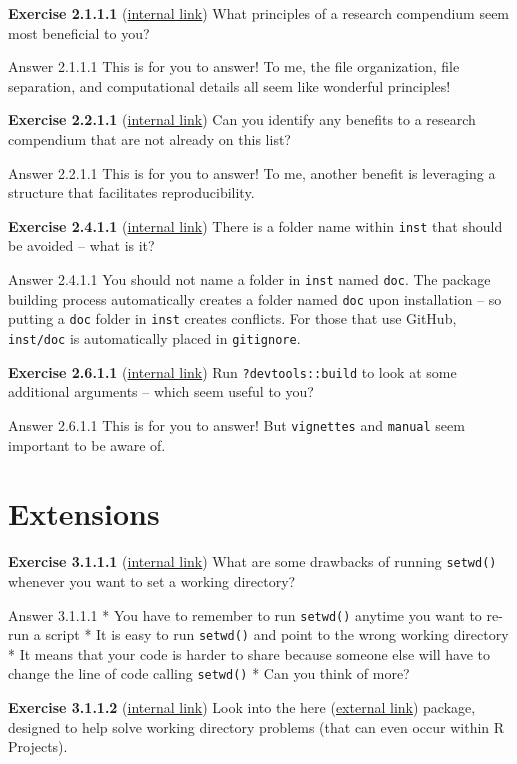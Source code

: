 \documentclass[
]{book}
\begin{document}
\textbf{Exercise 2.1.1.1} (\protect\hyperlink{ex-set7}{internal link})
What principles of a research compendium seem most beneficial to you?

Answer 2.1.1.1
This is for you to answer! To me, the file organization, file separation, and computational details all seem like wonderful principles!

\textbf{Exercise 2.2.1.1} (\protect\hyperlink{ex-set8}{internal link})
Can you identify any benefits to a research compendium that are not already on this list?

Answer 2.2.1.1
This is for you to answer! To me, another benefit is leveraging a structure that facilitates reproducibility.

\textbf{Exercise 2.4.1.1} (\protect\hyperlink{ex-set9}{internal link})
There is a folder name within \texttt{inst} that should be avoided -- what is it?

Answer 2.4.1.1
You should not name a folder in \texttt{inst} named \texttt{doc}. The package building process automatically creates a folder named \texttt{doc} upon installation -- so putting a \texttt{doc} folder in \texttt{inst} creates conflicts. For those that use GitHub, \texttt{inst/doc} is automatically placed in \texttt{gitignore}.

\textbf{Exercise 2.6.1.1} (\protect\hyperlink{ex-set10}{internal link})
Run \texttt{?devtools::build} to look at some additional arguments -- which seem useful to you?

Answer 2.6.1.1
This is for you to answer! But \texttt{vignettes} and \texttt{manual} seem important to be aware of.

\hypertarget{extensions-1}{%
\section*{Extensions}\label{extensions-1}}

\textbf{Exercise 3.1.1.1} (\protect\hyperlink{ex-set11}{internal link})
What are some drawbacks of running \texttt{setwd()} whenever you want to set a working directory?

Answer 3.1.1.1
* You have to remember to run \texttt{setwd()} anytime you want to re-run a script
* It is easy to run \texttt{setwd()} and point to the wrong working directory
* It means that your code is harder to share because someone else will have to change the line of code calling \texttt{setwd()}
* Can you think of more?

\textbf{Exercise 3.1.1.2} (\protect\hyperlink{ex-set11}{internal link})
Look into the here (\href{https://here.r-lib.org/}{external link}) package, designed to help solve working directory problems (that can even occur within R Projects).
\end{document}

